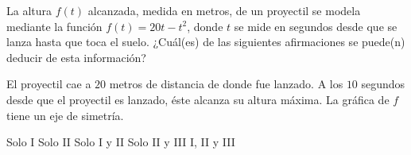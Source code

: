 \documentclass[borrador]{srs3}
\begin{document}
\begin{preguntas}
\begin{columnas}[0.5][t]
\end{columnas}
\pregunta La altura \(f\left(t\right)\) alcanzada, medida en metros, de un proyectil se modela mediante la función \(f\left(t\right)=20t-t^2\), donde \(t\) se mide en segundos desde que se lanza hasta que toca el suelo. ¿Cuál(es) de las siguientes afirmaciones se puede(n) deducir de esta información?
\begin{opciones}
\opcion El proyectil cae a \(20\) metros de distancia de donde fue lanzado.
\opcion A los \(10\) segundos desde que el proyectil es lanzado, éste alcanza su altura máxima.
\opcion La gráfica de \(f\) tiene un eje de simetría.
\end{opciones}
\begin{alternativas}
\alternativa Solo I
\alternativa Solo II
\alternativa Solo I y II
\alternativa Solo II y III
\alternativa I, II y III
\end{alternativas}


\end{preguntas}
\end{document}
